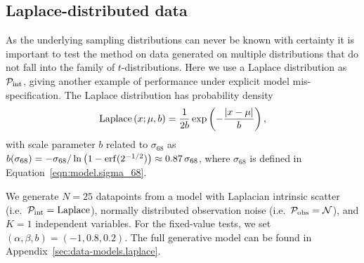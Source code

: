\documentclass[fleqn,usenatbib]{rasti}
\begin{document}

\subsection{Laplace-distributed data}
\label{sec:results.laplace}

As the underlying sampling distributions can never be known with certainty it is
important to test the method on data generated on multiple distributions that do
not fall into the family of $t$-distributions. Here we use a Laplace
distribution as $\mathcal P_{\rm int}$, giving another example of performance
under explicit model mis-specification. The Laplace distribution has probability
density
\begin{equation}
    {\rm Laplace}\left(x; \mu, b\right) =
        \frac1{2b} \exp\left(-\frac{\left|x - \mu\right|}{b}\right),
\end{equation}
with scale parameter $b$ related to $\sigma_{68}$ as $b(\sigma_{68}) =
- \sigma_{68} / \ln \left( 1 - {\rm erf} (2^{-1/2})\right) \approx 0.87\,
\sigma_{68}$, where $\sigma_{68}$ is defined in
Equation~\ref{eqn:model.sigma_68}.

We generate $N = 25$ datapoints from a model with Laplacian intrinsic scatter
(i.e.\ $\mathcal P_{\rm int} = \mathrm{Laplace}$), normally distributed
observation noise (i.e.\ $\mathcal P_{\rm obs} = \mathcal N$), and $K = 1$
independent variables. For the fixed-value tests, we set $(\alpha, \beta, b) =
(-1, 0.8, 0.2)$. The full generative model can be found in
Appendix~\ref{sec:data-models.laplace}.
\end{document}
